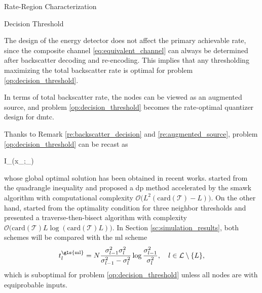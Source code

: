 \begin{section}{Rate-Region Characterization}
\begin{subsection}{Decision Threshold}
		\begin{remark}
			The design of the energy detector does not affect the primary achievable rate, since the composite channel \eqref{eq:equivalent_channel} can always be determined after backscatter decoding and re-encoding.
			This implies that any thresholding maximizing the total backscatter rate is optimal for problem \eqref{op:decision_threshold}.
			\label{re:backscatter_decision}
		\end{remark}

		\begin{remark}
			In terms of total backscatter rate, the nodes can be viewed as an augmented source, and problem \eqref{op:decision_threshold} becomes the rate-optimal quantizer design for \gls{dmtc}.
			\label{re:augmented_source}
		\end{remark}

		Thanks to Remark \ref{re:backscatter_decision} and \ref{re:augmented_source}, problem \eqref{op:decision_threshold} can be recast as
		\begin{maxi!}
			{}{I_{}(x_{};_{})}{\label{op:decision_threshold_discrete}}{\label{ob:decision_threshold_discrete}}
			\addConstraint{\eqref{co:sequential_threshold},}
		\end{maxi!}
		whose global optimal solution has been obtained in recent works.
		\cite{He2021} started from the quadrangle inequality and proposed a \gls{dp} method accelerated by the \gls{smawk} algorithm with computational complexity $\mathcal{O}\bigl(L^2(\mathrm{card}(\mathcal{T}){-}L)\bigr)$.
		On the other hand, \cite{Nguyen2020a} started from the optimality condition for three neighbor thresholds and presented a traverse-then-bisect algorithm with complexity $\mathcal{O}\bigl(\mathrm{card}(\mathcal{T})L\log(\mathrm{card}(\mathcal{T})L)\bigr)$.
		In Section \ref{sc:simulation_results}, both schemes will be compared with the \gls{ml} scheme \cite{Qian2019}
		\begin{equation}
			t_{l}^{\text{\gls{ml}}} = N \frac{\sigma_{l-1}^2 \sigma_{l}^2}{\sigma_{l-1}^2 - \sigma_{l}^2} \log \frac{\sigma_{l-1}^2}{\sigma_{l}^2}, \quad l \in \mathcal{L} \setminus \{L\},
			\label{eq:detection_threshold_ml}
		\end{equation}
		which is suboptimal for problem \eqref{op:decision_threshold} unless all nodes are with equiprobable inputs.
	\end{subsection}
\end{section}


